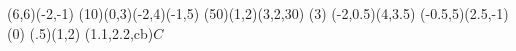 \documentclass{article}
\begin{document}
\begin{lapdf}(6,6)(-2,-1) %
\Lingrid(10)(0,3)(-2,4)(-1,5)%
\Red %
\Ellipse(50)(1,2)(3,2,30) %
\Stroke %
\Blue %
\Dash(3)%
\Line(-2,0.5)(4,3.5) \Stroke
\Line(-0.5,5)(2.5,-1) \Stroke
\Dash(0)
\Point(.5)(1,2)%
\Text(1.1,2.2,cb){$C$} %
\end{lapdf}
\end{document}
